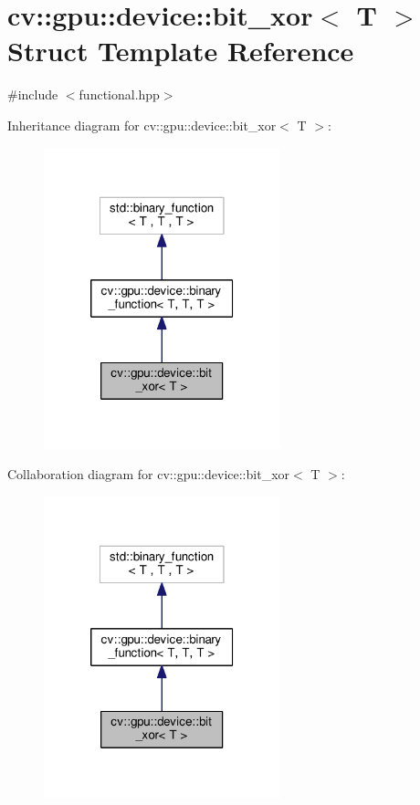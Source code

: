 \hypertarget{structcv_1_1gpu_1_1device_1_1bit__xor}{\section{cv\-:\-:gpu\-:\-:device\-:\-:bit\-\_\-xor$<$ T $>$ Struct Template Reference}
\label{structcv_1_1gpu_1_1device_1_1bit__xor}
}


{\ttfamily \#include $<$functional.\-hpp$>$}



Inheritance diagram for cv\-:\-:gpu\-:\-:device\-:\-:bit\-\_\-xor$<$ T $>$\-:\nopagebreak
\begin{figure}[H]
\begin{center}
\leavevmode
\includegraphics[width=194pt]{structcv_1_1gpu_1_1device_1_1bit__xor__inherit__graph}
\end{center}
\end{figure}


Collaboration diagram for cv\-:\-:gpu\-:\-:device\-:\-:bit\-\_\-xor$<$ T $>$\-:\nopagebreak
\begin{figure}[H]
\begin{center}
\leavevmode
\includegraphics[width=194pt]{structcv_1_1gpu_1_1device_1_1bit__xor__coll__graph}
\end{center}
\end{figure}
